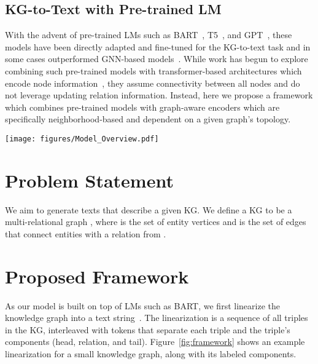 \documentclass[11pt]{article}
\begin{document}
\subsection{KG-to-Text with Pre-trained LM}
With the advent of pre-trained LMs such as BART~\cite{lewis2020bart}, T5~\cite{raffel2020exploring}, and GPT~\cite{radford2018improving,radford2019language}, these models have been directly adapted and fine-tuned for the KG-to-text task and in some cases outperformed GNN-based models~\cite{ribeiro2020investigating,kale2020text,chen-etal-2020-kgpt,mager2020gpt}. While work has begun to explore combining such pre-trained models with transformer-based architectures which encode node information~\cite{ke-etal-2021-jointgt}, they assume connectivity between all nodes and do not leverage updating relation information. Instead, here we propose a framework which combines pre-trained models with graph-aware encoders which are specifically neighborhood-based and dependent on a given graph's topology.
\begin{figure*}[t]
\centering
\texttt{[image: figures/Model\_Overview.pdf]}
\caption{Overview of the Graph-aware framework for graph-to-text generation. Given a KG, we first transform the graph into its appropriate representation before linearizing the graph. Next, each node of the KG is encoded via a global attention, followed by a graph-aware attention, ultimately being decoded into a sequence of tokens.}
\label{fig:framework}
\end{figure*}


\section{Problem Statement}
We aim to generate texts that describe a given KG. We define a KG to be a multi-relational graph , where  is the set of entity vertices and  is the set of edges that connect entities with a relation from .

\section{Proposed Framework}
As our model is built on top of LMs such as BART, we first linearize the knowledge graph into a text string~\cite{distiawan2018gtr,moryossef2019step,su2021plan}. The linearization is a sequence of all triples in the KG, interleaved with tokens that separate each triple and the triple's components (head, relation, and tail). Figure~\ref{fig:framework} shows an example linearization for a small knowledge graph, along with its labeled components. 
\end{document}
